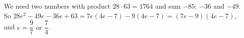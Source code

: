 We need two numbers with product $28\cdot63=1764$ and sum $-85$: $-36$ and $-49$. So $28e^2-49e-36e+63=7e(4e-7)-9(4e-7)=(7e-9)(4e-7)$, and $e=\boxed{\dfrac97\text{ or }\dfrac74}$.
